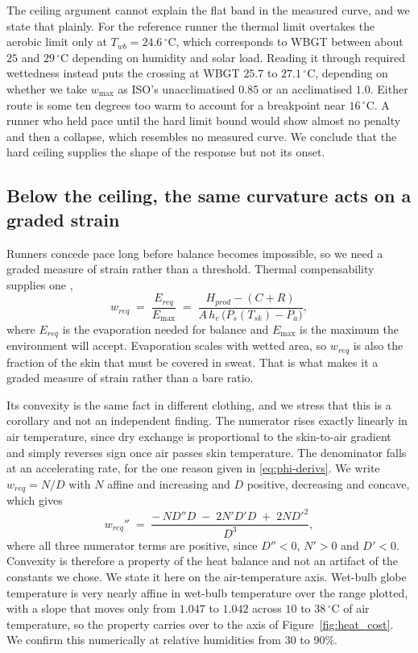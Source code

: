 The ceiling argument cannot explain the flat band in the measured curve, and we
state that plainly. For the reference runner the thermal limit overtakes the
aerobic limit only at $T_{wb} = 24.6\,^{\circ}$C, which corresponds to WBGT
between about $25$ and $29\,^{\circ}$C depending on humidity and solar load.
Reading it through required wettedness instead puts the crossing at WBGT $25.7$
to $27.1\,^{\circ}$C, depending on whether we take $w_{\max}$ as ISO's
unacclimatised $0.85$ or an acclimatised $1.0$. Either route is some ten degrees
too warm to account for a breakpoint near $16\,^{\circ}$C. A runner who held
pace until the hard limit bound would show almost no penalty and then a
collapse, which resembles no measured curve. We conclude that the hard ceiling
supplies the shape of the response but not its onset.

\subsection{Below the ceiling, the same curvature acts on a graded strain}
\label{app:physics:graded}

Runners concede pace long before balance becomes impossible, so we need a graded
measure of strain rather than a threshold. Thermal compensability supplies one
\citep{taylor2006, belding1955},
\begin{equation}
  w_{req} \;=\; \frac{E_{req}}{E_{\max}}
  \;=\; \frac{H_{prod} - (C + R)}
             {A\,h_e\,\bigl(P_s(T_{sk}) - P_a\bigr)},
  \label{eq:wreq}
\end{equation}
where $E_{req}$ is the evaporation needed for balance and $E_{\max}$ is the
maximum the environment will accept. Evaporation scales with wetted area, so
$w_{req}$ is also the fraction of the skin that must be covered in sweat. That
is what makes it a graded measure of strain rather than a bare ratio.

Its convexity is the same fact in different clothing, and we stress that this is
a corollary and not an independent finding. The numerator rises exactly linearly
in air temperature, since dry exchange is proportional to the skin-to-air
gradient and simply reverses sign once air passes skin temperature. The
denominator falls at an accelerating rate, for the one reason given in
\eqref{eq:phi-derivs}. We write $w_{req} = N/D$ with $N$ affine and increasing
and $D$ positive, decreasing and concave, which gives
\begin{equation}
  w_{req}'' \;=\; \frac{-\,N D'' D \;-\; 2 N' D' D \;+\; 2 N D'^{2}}{D^{3}},
  \label{eq:convex}
\end{equation}
where all three numerator terms are positive, since $D'' < 0$, $N' > 0$ and $D'
< 0$. Convexity is therefore a property of the heat balance and not an artifact
of the constants we chose. We state it here on the air-temperature axis.
Wet-bulb globe temperature is very nearly affine in wet-bulb temperature over
the range plotted, with a slope that moves only from $1.047$ to $1.042$ across
$10$ to $38\,^{\circ}$C of air temperature, so the property carries over to the
axis of Figure~\ref{fig:heat_cost}. We confirm this numerically at relative
humidities from 30 to 90\%.

